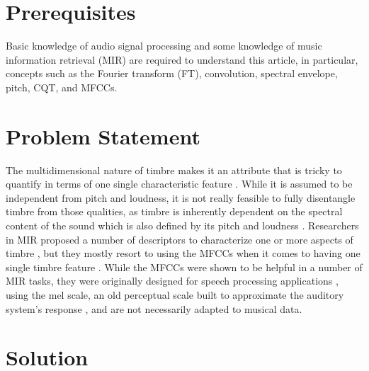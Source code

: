 \documentclass[journal]{IEEEtran}
\begin{document}
\section{Prerequisites}

Basic knowledge of audio signal processing and some knowledge of music information retrieval (MIR) \cite{mueller2007} are required to understand this article, in particular, concepts such as the Fourier transform (FT), convolution, spectral envelope, pitch, CQT, and MFCCs.


\section{Problem Statement}

The multidimensional nature of timbre makes it an attribute that is tricky to quantify in terms of one single characteristic feature \cite{grey1977}. While it is assumed to be independent from pitch and loudness, it is not really feasible to fully disentangle timbre from those qualities, as timbre is inherently dependent on the spectral content of the sound which is also defined by its pitch and loudness \cite{moore2004}. Researchers in MIR proposed a number of descriptors to characterize one or more aspects of timbre \cite{peeters2003}, but they mostly resort to using the MFCCs when it comes to having one single timbre feature \cite{mueller2007}. While the MFCCs were shown to be helpful in a number of MIR tasks, they were originally designed for speech processing applications \cite{davis1980}, using the mel scale, an old perceptual scale built to approximate the auditory system's response \cite{stevens1937}, and are not necessarily adapted to musical data.

%

\cite{engel2017}


\section{Solution}

%
%
\end{document}
